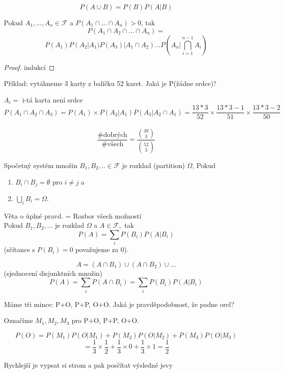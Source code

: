 \documentclass[../main.tex]{subfiles}
\begin{document}
\begin{definition}
    \[P(A\cup B) = P(B)P(A|B)\]
\end{definition}

\begin{theorem}
    Pokud $A_1,\dots,A_n \in \mathcal{F}$ a $P(A_1\cap \dots \cap A_n) > 0$, tak
    \[P(A_1\cap A_2 \cap \dots \cap A_n) = \]
    \[P(A_1)P(A_2|A_1)P(A_3)|A_1\cap A_2) \dots P(A_n | \bigcap^{n-1}_{i=1} A_i)\]
\end{theorem}
\begin{proof}
    indukcí    
\end{proof}


\begin{example}
    Příklad: vytáhneme 3 karty z balíčku 52 karet. Jaká je P(žádne srdce)?

    $A_i =$ i-tá karta není srdce\\
    \[P(A_1\cap A_2 \cap A_3) = P(A_1) \times P(A_2 | A_1) P(A_3 | A_2\cap A_1) = \frac{13*3}{52} \times \frac{13*3 -1}{51} \times \frac{13*3 - 2}{50}\]
    \\ \[\frac{\text{\#dobrých}}{\text{\#všech}} = \frac{\binom{39}{3}}{\binom{52}{3}}\]
\end{example}

\begin{definition}
    Spočetný systém množin $B_1,B_2,..\in \mathcal{F}$ je rozklad (partition) $\Omega$, Pokud
    \begin{enumerate}
        \item $B_i \cap B_j = \emptyset$ pro $i \neq j$ a
        \item $\bigcup_i B_i = \Omega$.
    \end{enumerate}
\end{definition}

\begin{theorem}
    Věta o úplné pravd. = Rozbor všech možností
    \\ Pokud $B_1,B_2,...$ je rozklad $\Omega$ a $A \in \mathcal{F},$ tak
    \[P(A) = \sum_i P(B_i)P(A|B_i)\]
    (sčítance s $P(B_i) = 0$ považujeme za $0$).

    \[A = (A\cap B_1) \cup (A\cap B_2) \cup \dots\]
    (sjednocení disjunktních množin)
    \[P(A) = \sum_i P(A\cap B_i) = \sum_i P(B_i)P(A|B_i)\]
\end{theorem}

\begin{example}
    Máme tři mince: P+O, P+P, O+O. Jaká je pravděpodobnost, že padne orel?

    \noindent
    Označíme $M_1, M_2, M_3$ pro P+O, P+P, O+O.
    
    \[P(O) = P(M_1)P(O|M_1) + P(M_2)P(O|M_2) + P(M_3)P(O|M_3)\]
    \[ = \frac{1}{3}\times \frac{1}{2} + \frac{1}{3}\times 0 + \frac{1}{3}\times 1 = \frac{1}{2}\]

    \noindent
    Rychlejší je vypsat si strom a pak posčítat výsledné jevy
\end{example}
\end{document}
